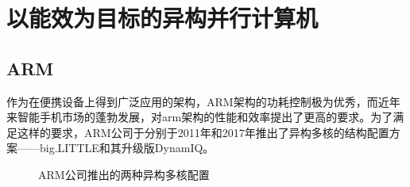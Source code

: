 \documentclass[UTF8,a4paper,10pt]{ctexart}
\newcommand{\xiaosi}{\fontsize{12pt}{18pt}\selectfont}            %
\begin{document}



\section{以能效为目标的异构并行计算机}
\subsection{ARM}
作为在便携设备上得到广泛应用的架构，ARM架构的功耗控制极为优秀，而近年来智能手机市场的蓬勃发展，对arm架构的性能和效率提出了更高的要求。为了满足这样的要求，ARM公司于分别于2011年和2017年推出了异构多核的结构配置方案——big.LITTLE和其升级版DynamIQ。

\begin{figure}[htbp]
\centering
{}%
\centering
\caption{ARM公司推出的两种异构多核配置\cite{arm_dynamiq}}
\label{fig:arm_heter_cores}
\end{figure}
\end{document}
